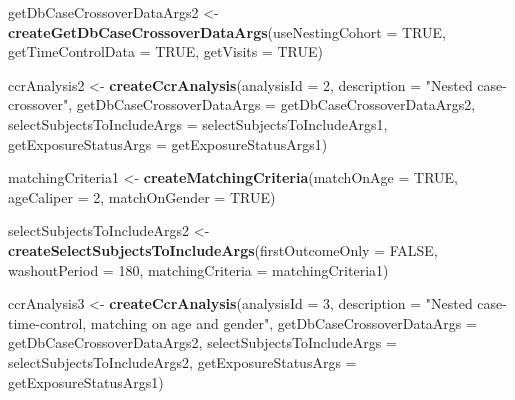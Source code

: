 \documentclass[]{article}
\newenvironment{Shaded}{\begin{snugshade}}{\end{snugshade}}
\newcommand{\DataTypeTok}[1]{\textcolor[rgb]{0.13,0.29,0.53}{#1}}
\newcommand{\DecValTok}[1]{\textcolor[rgb]{0.00,0.00,0.81}{#1}}
\newcommand{\KeywordTok}[1]{\textcolor[rgb]{0.13,0.29,0.53}{\textbf{#1}}}
\newcommand{\NormalTok}[1]{#1}
\newcommand{\OtherTok}[1]{\textcolor[rgb]{0.56,0.35,0.01}{#1}}
\newcommand{\StringTok}[1]{\textcolor[rgb]{0.31,0.60,0.02}{#1}}
\begin{document}
\begin{Shaded}
\begin{Highlighting}[]
\NormalTok{getDbCaseCrossoverDataArgs2 <-}\StringTok{ }\KeywordTok{createGetDbCaseCrossoverDataArgs}\NormalTok{(}\DataTypeTok{useNestingCohort =} \OtherTok{TRUE}\NormalTok{,}
                                                       \DataTypeTok{getTimeControlData =} \OtherTok{TRUE}\NormalTok{,}
                                                       \DataTypeTok{getVisits =} \OtherTok{TRUE}\NormalTok{)}

\NormalTok{ccrAnalysis2 <-}\StringTok{ }\KeywordTok{createCcrAnalysis}\NormalTok{(}\DataTypeTok{analysisId =} \DecValTok{2}\NormalTok{,}
                                \DataTypeTok{description =} \StringTok{"Nested case-crossover"}\NormalTok{,}
                                \DataTypeTok{getDbCaseCrossoverDataArgs =}\NormalTok{ getDbCaseCrossoverDataArgs2,}
                                \DataTypeTok{selectSubjectsToIncludeArgs =}\NormalTok{ selectSubjectsToIncludeArgs1,}
                                \DataTypeTok{getExposureStatusArgs =}\NormalTok{ getExposureStatusArgs1)}

\NormalTok{matchingCriteria1 <-}\StringTok{ }\KeywordTok{createMatchingCriteria}\NormalTok{(}\DataTypeTok{matchOnAge =} \OtherTok{TRUE}\NormalTok{,}
                                           \DataTypeTok{ageCaliper =} \DecValTok{2}\NormalTok{,}
                                           \DataTypeTok{matchOnGender =} \OtherTok{TRUE}\NormalTok{)}

\NormalTok{selectSubjectsToIncludeArgs2 <-}\StringTok{ }\KeywordTok{createSelectSubjectsToIncludeArgs}\NormalTok{(}\DataTypeTok{firstOutcomeOnly =} \OtherTok{FALSE}\NormalTok{,}
                                                                  \DataTypeTok{washoutPeriod =} \DecValTok{180}\NormalTok{,}
                                                                  \DataTypeTok{matchingCriteria =}\NormalTok{ matchingCriteria1)}

\NormalTok{ccrAnalysis3 <-}\StringTok{ }\KeywordTok{createCcrAnalysis}\NormalTok{(}\DataTypeTok{analysisId =} \DecValTok{3}\NormalTok{,}
                                \DataTypeTok{description =} \StringTok{"Nested case-time-control, matching on age and gender"}\NormalTok{,}
                                \DataTypeTok{getDbCaseCrossoverDataArgs =}\NormalTok{ getDbCaseCrossoverDataArgs2,}
                                \DataTypeTok{selectSubjectsToIncludeArgs =}\NormalTok{ selectSubjectsToIncludeArgs2,}
                                \DataTypeTok{getExposureStatusArgs =}\NormalTok{ getExposureStatusArgs1)}


\end{Highlighting}
\end{Shaded}
\end{document}
